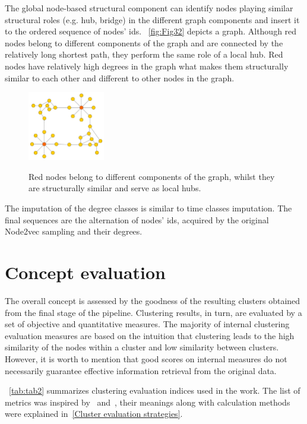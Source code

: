 The global node-based structural component can identify nodes playing similar structural roles (e.g. hub, bridge) in the different graph components and insert it to the ordered sequence of nodes' ids. ~\autoref{fig:Fig32} depicts a graph. Although red nodes belong to different components of the graph and are connected by the relatively long shortest path, they perform the same role of a local hub. Red nodes have relatively high degrees in the graph what makes them structurally similar to each other and different to other nodes in the graph.
\begin{figure}[!ht]
	\centering
	\includegraphics[width=0.3\textwidth]{images/Fig32.pdf}\\
	\caption{Red nodes belong to different components of the graph, whilst they are structurally similar and serve as local hubs.}
	\label{fig:Fig32}
\end{figure}

The imputation of the degree classes is similar to time classes imputation. The final sequences are the alternation of nodes' ids, acquired by the original Node2vec sampling and their degrees.

\section{Concept evaluation}
\label{Concept evaluation}
The overall concept is assessed by the goodness of the resulting clusters obtained from the final stage of the pipeline. Clustering results, in turn, are evaluated by a set of objective and quantitative measures. The majority of internal clustering evaluation measures are based on the intuition that clustering leads to the high similarity of the nodes within a cluster and low similarity between clusters. However, it is worth to mention that good scores on internal measures do not necessarily guarantee effective information retrieval from the original data.

~\autoref{tab:tab2} summarizes clustering evaluation indices used in the work. The list of metrics was inspired by~\cite{liu2010understanding} and~\cite{kovacs2005cluster}, their meanings along with calculation methods were explained in~\ref{Cluster evaluation strategies}.

